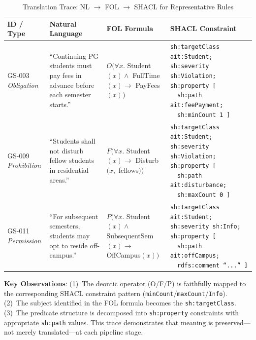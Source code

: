 \begin{table}[htbp]
\centering
\caption{Translation Trace: NL $\rightarrow$ FOL $\rightarrow$ SHACL for Representative Rules}
\label{tab:trace-table}
\small
\begin{tabular}{|p{1.2cm}|p{4cm}|p{3.5cm}|p{4.5cm}|}
\hline
\textbf{ID / Type} & \textbf{Natural Language} & \textbf{FOL Formula} & \textbf{SHACL Constraint} \\
\hline
GS-003 \newline \textit{Obligation} &
``Continuing PG students must pay fees in advance before each semester starts.'' &
$O(\forall x.$ Student$(x) \wedge$ FullTime$(x) \rightarrow$ PayFees$(x))$ &
\texttt{sh:targetClass ait:Student;} \newline \texttt{sh:severity sh:Violation;} \newline \texttt{sh:property [} \newline \texttt{~~sh:path ait:feePayment;} \newline \texttt{~~sh:minCount 1 ]} \\
\hline
GS-009 \newline \textit{Prohibition} &
``Students shall not disturb fellow students in residential areas.'' &
$F(\forall x.$ Student$(x) \rightarrow$ Disturb$(x,$ fellows$))$ &
\texttt{sh:targetClass ait:Student;} \newline \texttt{sh:severity sh:Violation;} \newline \texttt{sh:property [} \newline \texttt{~~sh:path ait:disturbance;} \newline \texttt{~~sh:maxCount 0 ]} \\
\hline
GS-011 \newline \textit{Permission} &
``For subsequent semesters, students may opt to reside off-campus.'' &
$P(\forall x.$ Student$(x) \wedge$ SubsequentSem$(x) \rightarrow$ OffCampus$(x))$ &
\texttt{sh:targetClass ait:Student;} \newline \texttt{sh:severity sh:Info;} \newline \texttt{sh:property [} \newline \texttt{~~sh:path ait:offCampus;} \newline \texttt{~~rdfs:comment ``...'' ]} \\
\hline
\end{tabular}
\end{table}

\textbf{Key Observations}: (1)~The deontic operator (O/F/P) is faithfully mapped to the corresponding SHACL constraint pattern (\texttt{minCount}/\texttt{maxCount}/\texttt{Info}). (2)~The subject identified in the FOL formula becomes the \texttt{sh:targetClass}. (3)~The predicate structure is decomposed into \texttt{sh:property} constraints with appropriate \texttt{sh:path} values. This trace demonstrates that meaning is preserved---not merely translated---at each pipeline stage.

